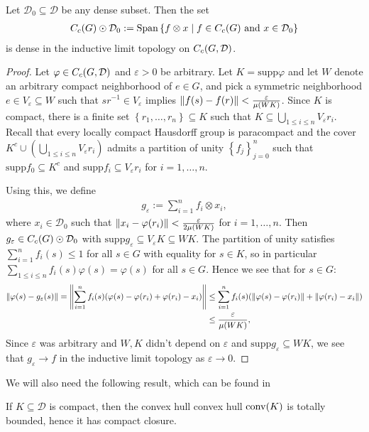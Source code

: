 \begin{lemma}
Let $\mathcal{D}_0 \subseteq \mathcal{D}$ be any dense subset. Then the set
\begin{align*}
C_c(G) \odot \mathcal{D}_0 := \mathrm{Span}\left\{ f \otimes x \mid f \in C_c(G) \text{ and } x \in \mathcal{D}_0 \right\} 
\end{align*}
is dense in the inductive limit topology on $C_c(G,\mathcal{D})$.
\label{int:indlmdense}
\end{lemma}
\begin{proof}	
Let $\varphi \in C_c(G,\mathcal{D})$ and $\varepsilon > 0$ be arbitrary. Let $K= \mathrm{supp} \varphi$ and let $W$ denote an arbitrary compact neighborhood of $e \in G$, and pick a symmetric neighborhood $e \in V_{\varepsilon} \subseteq W$ such that $sr^{-1} \in V_\varepsilon$ implies $\left\lVert f(s) - f(r) \right\rVert < \frac{\varepsilon}{\mu(WK)}$. Since $K$ is compact, there is a finite set $\left\{ r_1,\dots,r_n \right\} \subseteq K$ such that $K \subseteq \bigcup_{1 \leq i \leq n} V_\varepsilon r_i$. Recall that every locally compact Hausdorff group is paracompact and the cover $K^c \cup \left( \bigcup_{1 \leq i \leq n } V_\varepsilon r_i \right)$ admits a partition of unity $\left\{ f_j \right\}_{j=0}^n$ such that $\mathrm{supp}f_0 \subseteq K^c$ and $\mathrm{supp}f_i \subseteq V_\varepsilon r_i$ for $i = 1 ,\dots,n$. 

Using this, we define
\begin{align*}
	g_\varepsilon := \sum_{i=1}^n f_i \otimes x_i,
\end{align*}
where $x_i \in \mathcal{D}_0$ such that $\left\lVert x_i - \varphi(r_i)\right\rVert < \frac{\varepsilon}{2\mu(WK)}$ for $i = 1,\dots,n$. Then $g_\varepsilon \in C_c(G) \odot \mathcal{D}_0$ with $\mathrm{supp} g_\varepsilon \subseteq V_\varepsilon K \subseteq W K$. The partition of unity satisfies $\sum_{i=1}^n f_i(s) \leq 1$ for all $s \in G$ with equality for $s \in K$, so in particular $\sum_{1 \leq i \leq n}f_i(s) \varphi(s) = \varphi(s)$ for all $s \in G$. Hence we see that for $s \in G$: 
\begin{align*}
	\left\lVert\varphi(s) - g_{\varepsilon}(s)\right\rVert = \left\lVert \sum_{i=1}^n f_i(s)(\varphi(s) - \varphi(r_i)+\varphi(r_i)-x_i)\right\rVert &\leq \sum_{i=1}^n f_i(s) (\left\lVert \varphi(s) - \varphi(r_i)\right\rVert+\left\lVert \varphi(r_i)-x_i\right\rVert) \\
	&\leq \frac{\varepsilon}{\mu(WK)},
\end{align*}
Since $\varepsilon$ was arbitrary and $W,K$ didn't depend on $\varepsilon$ and $ \mathrm{supp} g_\varepsilon \subseteq WK$, we see that $g_\varepsilon \to f$ in the inductive limit topology as $\varepsilon \to 0$.
\end{proof}
We will also need the following result, which can be found in \cite[Theorem 3.20, part (b, c)]{rudin1991functional}
\begin{lemma}
	If $K \subseteq \mathcal{D}$ is compact, then the convex hull convex hull $\operatorname{conv}(K)$ is totally bounded, hence it has compact closure.
\label{int:clconvcomp}
\end{lemma}

